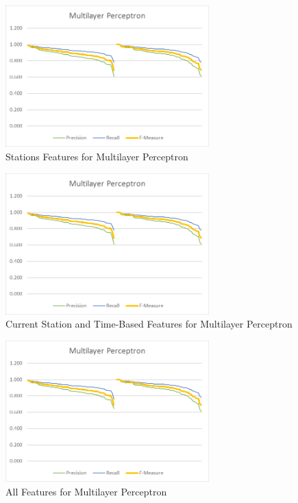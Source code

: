\begin{figure}[H]
	\centering
	\includegraphics[width=0.7\textwidth]{files/high_vs_low_frequency/mp_stas}
	\caption{Stations Features for Multilayer Perceptron}
\end{figure}

\begin{figure}[H]
	\centering
	\includegraphics[width=0.7\textwidth]{files/high_vs_low_frequency/mp_csta_ts}
	\caption{Current Station and Time-Based Features for Multilayer Perceptron}
\end{figure}

\begin{figure}[H]
	\centering
	\includegraphics[width=0.7\textwidth]{files/high_vs_low_frequency/mp_all}
	\caption{All Features for Multilayer Perceptron}
\end{figure}


